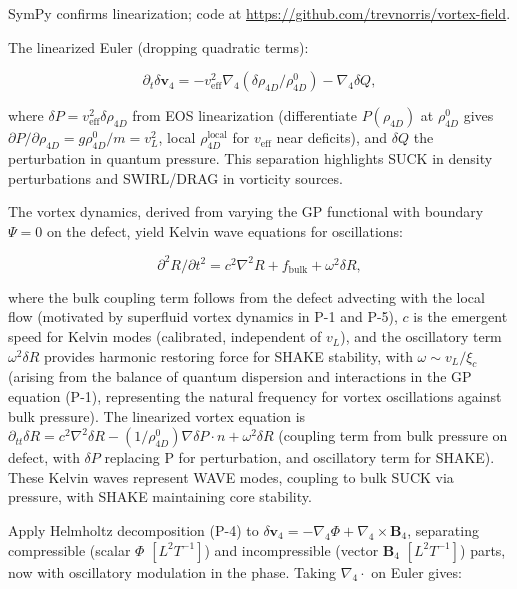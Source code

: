 SymPy confirms linearization; code at \url{https://github.com/trevnorris/vortex-field}.

The linearized Euler (dropping quadratic terms):

\begin{equation}
\partial_t \delta \mathbf{v}_4 = -v_{\text{eff}}^2 \nabla_4 (\delta \rho_{4D} / \rho_{4D}^0) - \nabla_4 \delta Q,
\end{equation}

where $\delta P = v_{\text{eff}}^2 \delta \rho_{4D}$ from EOS linearization (differentiate $P(\rho_{4D})$ at $\rho_{4D}^0$ gives $\partial P / \partial \rho_{4D} = g \rho_{4D}^0 / m = v_L^2$, local $\rho_{4D}^{\text{local}}$ for $v_{\text{eff}}$ near deficits), and $\delta Q$ the perturbation in quantum pressure. This separation highlights SUCK in density perturbations and SWIRL/DRAG in vorticity sources.

The vortex dynamics, derived from varying the GP functional with boundary $\Psi=0$ on the defect, yield Kelvin wave equations for oscillations:

\begin{equation}
\partial^2 R / \partial t^2 = c^2 \nabla^2 R + f_{\text{bulk}} + \omega^2 \delta R,
\end{equation}

where the bulk coupling term follows from the defect advecting with the local flow (motivated by superfluid vortex dynamics in P-1 and P-5), $c$ is the emergent speed for Kelvin modes (calibrated, independent of $v_L$), and the oscillatory term $\omega^2 \delta R$ provides harmonic restoring force for SHAKE stability, with $\omega \sim v_L / \xi_c$ (arising from the balance of quantum dispersion and interactions in the GP equation (P-1), representing the natural frequency for vortex oscillations against bulk pressure). The linearized vortex equation is $\partial_{tt} \delta R = c^2 \nabla^2 \delta R - (1 / \rho_{4D}^0) \nabla \delta P \cdot n + \omega^2 \delta R$ (coupling term from bulk pressure on defect, with $\delta P$ replacing P for perturbation, and oscillatory term for SHAKE). These Kelvin waves represent WAVE modes, coupling to bulk SUCK via pressure, with SHAKE maintaining core stability.

Apply Helmholtz decomposition (P-4) to $\delta \mathbf{v}_4 = -\nabla_4 \Phi + \nabla_4 \times \mathbf{B}_4$, separating compressible (scalar $\Phi$ $[L^2 T^{-1}]$) and incompressible (vector $\mathbf{B}_4$ $[L^2 T^{-1}]$) parts, now with oscillatory modulation in the phase. Taking $\nabla_4 \cdot$ on Euler gives:

